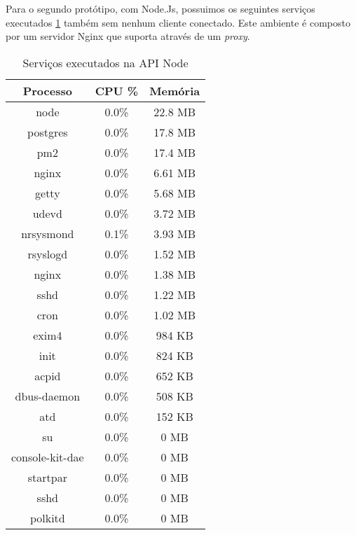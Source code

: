   Para o segundo protótipo, com Node.Js, possuimos os seguintes serviços executados \ref{tab:services-in-api-node} 
  também sem nenhum cliente conectado. Este ambiente é composto por um servidor Nginx que suporta através 
  de um \textit{proxy}.
  
   \begin{table}[H]
    \centering
    \footnotesize
    \setlength{\abovecaptionskip}{0pt}
    \setlength{\belowcaptionskip}{0pt}
    \caption[Serviços executados na API Node]{Serviços executados na API Node}
    \label{tab:services-in-api-node}
    \begin{tabular}{c|c|c}
      \hline \hline
      Processo  & 	CPU \% &	Memória \\
      \hline \hline
      node &		0.0\% &		22.8 MB \\
      postgres &	0.0\% &		17.8 MB \\
      pm2 &		0.0\% &		17.4 MB \\
      nginx &		0.0\% &		6.61 MB \\
      getty &		0.0\% &		5.68 MB \\
      udevd &		0.0\% &		3.72 MB \\
      nrsysmond &	0.1\% &		3.93 MB \\
      rsyslogd &	0.0\% &		1.52 MB \\
      nginx &		0.0\% &		1.38 MB \\
      sshd &		0.0\% &		1.22 MB \\
      cron &		0.0\% &		1.02 MB \\
      exim4 &		0.0\% &		984 KB \\
      init &		0.0\% &		824 KB \\
      acpid &		0.0\% &		652 KB \\
      dbus-daemon &	0.0\% &		508 KB \\
      atd &		0.0\% &		152 KB \\
      su &		0.0\% &		0 MB \\
      console-kit-dae &	0.0\% &		0 MB \\
      startpar & 	0.0\% &		0 MB \\
      sshd &		0.0\% &		0 MB \\
      polkitd &		0.0\% &		0 MB \\
      \hline \hline
    \end{tabular}
  \end{table}
   
